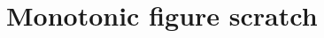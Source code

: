 \documentclass[a4paper,USenglish]{tex/lipics-v2016}
\begin{document}
\hrulefill

\begin{mathpar}

\end{mathpar}
\section{Monotonic figure scratch}













\end{document}
